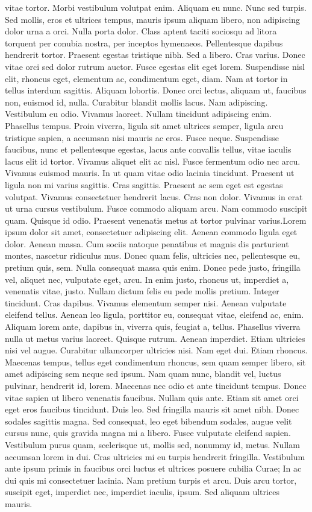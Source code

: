 vitae tortor. Morbi vestibulum volutpat enim. Aliquam eu nunc. Nunc sed turpis. Sed mollis, eros et ultrices tempus, mauris ipsum aliquam libero, non adipiscing dolor urna a orci. Nulla porta dolor. Class aptent taciti sociosqu ad litora torquent per conubia nostra, per inceptos hymenaeos. Pellentesque dapibus hendrerit tortor. Praesent egestas tristique nibh. Sed a libero. Cras varius. Donec vitae orci sed dolor rutrum auctor. Fusce egestas elit eget lorem. Suspendisse nisl elit, rhoncus eget, elementum ac, condimentum eget, diam. Nam at tortor in tellus interdum sagittis. Aliquam lobortis. Donec orci lectus, aliquam ut, faucibus non, euismod id, nulla. Curabitur blandit mollis lacus. Nam adipiscing. Vestibulum eu odio. Vivamus laoreet. Nullam tincidunt adipiscing enim. Phasellus tempus. Proin viverra, ligula sit amet ultrices semper, ligula arcu tristique sapien, a accumsan nisi mauris ac eros. Fusce neque. Suspendisse faucibus, nunc et pellentesque egestas, lacus ante convallis tellus, vitae iaculis lacus elit id tortor. Vivamus aliquet elit ac nisl. Fusce fermentum odio nec arcu. Vivamus euismod mauris. In ut quam vitae odio lacinia tincidunt. Praesent ut ligula non mi varius sagittis. Cras sagittis. Praesent ac sem eget est egestas volutpat. Vivamus consectetuer hendrerit lacus. Cras non dolor. Vivamus in erat ut urna cursus vestibulum. Fusce commodo aliquam arcu. Nam commodo suscipit quam. Quisque id odio. Praesent venenatis metus at tortor pulvinar varius.Lorem ipsum dolor sit amet, consectetuer adipiscing elit. Aenean commodo ligula eget dolor. Aenean massa. Cum sociis natoque penatibus et magnis dis parturient montes, nascetur ridiculus mus. Donec quam felis, ultricies nec, pellentesque eu, pretium quis, sem. Nulla consequat massa quis enim. Donec pede justo, fringilla vel, aliquet nec, vulputate eget, arcu. In enim justo, rhoncus ut, imperdiet a, venenatis vitae, justo. Nullam dictum felis eu pede mollis pretium. Integer tincidunt. Cras dapibus. Vivamus elementum semper nisi. Aenean vulputate eleifend tellus. Aenean leo ligula, porttitor eu, consequat vitae, eleifend ac, enim. Aliquam lorem ante, dapibus in, viverra quis, feugiat a, tellus. Phasellus viverra nulla ut metus varius laoreet. Quisque rutrum. Aenean imperdiet. Etiam ultricies nisi vel augue. Curabitur ullamcorper ultricies nisi. Nam eget dui. Etiam rhoncus. Maecenas tempus, tellus eget condimentum rhoncus, sem quam semper libero, sit amet adipiscing sem neque sed ipsum. Nam quam nunc, blandit vel, luctus pulvinar, hendrerit id, lorem. Maecenas nec odio et ante tincidunt tempus. Donec vitae sapien ut libero venenatis faucibus. Nullam quis ante. Etiam sit amet orci eget eros faucibus tincidunt. Duis leo. Sed fringilla mauris sit amet nibh. Donec sodales sagittis magna. Sed consequat, leo eget bibendum sodales, augue velit cursus nunc, quis gravida magna mi a libero. Fusce vulputate eleifend sapien. Vestibulum purus quam, scelerisque ut, mollis sed, nonummy id, metus. Nullam accumsan lorem in dui. Cras ultricies mi eu turpis hendrerit fringilla. Vestibulum ante ipsum primis in faucibus orci luctus et ultrices posuere cubilia Curae; In ac dui quis mi consectetuer lacinia. Nam pretium turpis et arcu. Duis arcu tortor, suscipit eget, imperdiet nec, imperdiet iaculis, ipsum. Sed aliquam ultrices mauris. 